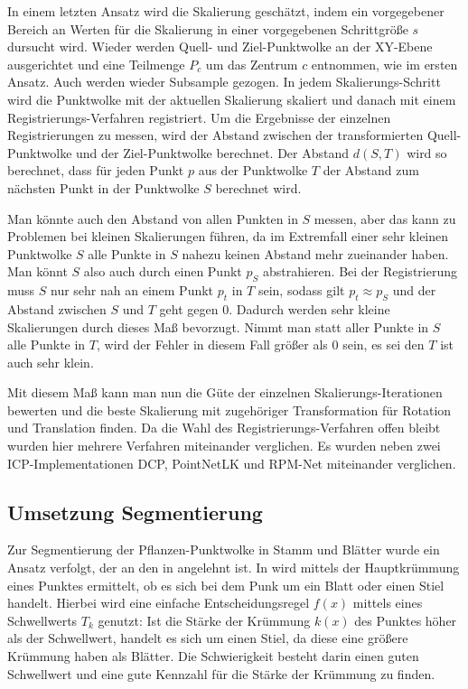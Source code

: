 \documentclass[12pt,titlepage, twoside]{article}
\begin{document}
In einem letzten Ansatz wird die Skalierung geschätzt, indem ein vorgegebener Bereich an Werten für die Skalierung in einer vorgegebenen Schrittgröße $s$ dursucht wird.
Wieder werden Quell- und Ziel-Punktwolke an der XY-Ebene ausgerichtet und eine Teilmenge $P_c$ um das Zentrum $c$ entnommen, wie im ersten Ansatz. Auch werden wieder Subsample gezogen.
In jedem Skalierungs-Schritt wird die Punktwolke mit der aktuellen Skalierung skaliert und danach mit einem Registrierungs-Verfahren registriert.
Um die Ergebnisse der einzelnen Registrierungen zu messen, wird der Abstand zwischen der transformierten Quell-Punktwolke und der Ziel-Punktwolke berechnet. 
Der Abstand $d(S,T)$ wird so berechnet, dass für jeden Punkt $p$ aus der Punktwolke $T$ der Abstand zum nächsten Punkt in der Punktwolke $S$ berechnet wird.

Man könnte auch den Abstand von allen Punkten in $S$ messen, aber das kann zu Problemen bei kleinen Skalierungen führen, 
da im Extremfall einer sehr kleinen Punktwolke $S$ alle Punkte in $S$ nahezu keinen Abstand mehr zueinander haben.
Man könnt $S$ also auch durch einen Punkt $p_{S}$ abstrahieren.
Bei der Registrierung muss $S$ nur sehr nah an einem Punkt $p_t$ in $T$ sein, sodass gilt $p_t \approx p_S$ und der Abstand zwischen $S$ und $T$ geht gegen $0$. 
Dadurch werden sehr kleine Skalierungen durch dieses Maß bevorzugt.
Nimmt man statt aller Punkte in $S$ alle Punkte in $T$, wird der Fehler in diesem Fall größer als $0$ sein, es sei den $T$ ist auch sehr klein.

Mit diesem Maß kann man nun die Güte der einzelnen Skalierungs-Iterationen bewerten und die beste Skalierung mit zugehöriger Transformation für Rotation und Translation finden.
Da die Wahl des Registrierungs-Verfahren offen bleibt wurden hier mehrere Verfahren miteinander verglichen. Es wurden neben zwei ICP-Implementationen DCP, PointNetLK und RPM-Net miteinander verglichen.

\subsection{Umsetzung Segmentierung}
\label{sec:realisierung:implementierung3}

Zur Segmentierung der Pflanzen-Punktwolke in Stamm und Blätter wurde ein Ansatz verfolgt, der an den in \cite{ThreeBasics} angelehnt ist.
In \cite{ThreeBasics} wird mittels der Hauptkrümmung eines Punktes ermittelt, ob es sich bei dem Punk um ein Blatt oder einen Stiel handelt. 
Hierbei wird eine einfache Entscheidungsregel $f(x)$ mittels eines Schwellwerts $T_k$ genutzt: 
Ist die Stärke der Krümmung $k(x)$ des Punktes höher als der Schwellwert, handelt es sich um einen Stiel, da diese eine größere Krümmung haben als Blätter.
Die Schwierigkeit besteht darin einen guten Schwellwert und eine gute Kennzahl für die Stärke der Krümmung zu finden.
\end{document}
